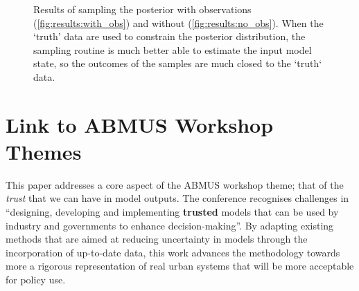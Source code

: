 \documentclass[runningheads]{llncs}
\begin{document}


\begin{figure}%
\centering
{}
\caption{Results of sampling the posterior with observations (\ref{fig:results:with_obs}) and without (\ref{fig:results:no_obs}). When the `truth' data are used to constrain the posterior distribution, the sampling routine is much better able to estimate the input model state, so the outcomes of the samples are much closed to the `truth` data.} 
\label{fig:model_uncertainty}
\end{figure}


\section{Link to ABMUS Workshop Themes}

This paper addresses a core aspect of the ABMUS workshop theme; that of the \textit{trust} that we can have in model outputs. The conference recognises challenges in ``designing, developing and implementing \textbf{trusted} models that can be used by industry and governments to enhance decision-making''. By adapting existing methods that are aimed at reducing uncertainty in models through the incorporation of up-to-date data, this work advances the methodology towards more a rigorous representation of real urban systems that will be more acceptable for policy use.
\end{document}
